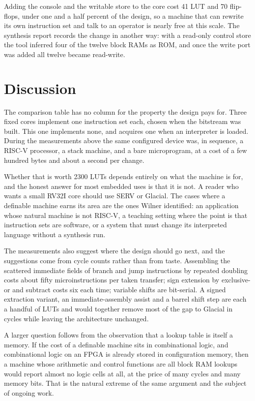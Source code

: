 \documentclass[11pt,a4paper]{article}
\begin{document}
Adding the console and the writable store to the core cost 41 LUT and
70 flip-flops, under one and a half percent of the design, so a machine
that can rewrite its own instruction set and talk to an operator is
nearly free at this scale. The synthesis report records the change in
another way: with a read-only control store the tool inferred four of
the twelve block RAMs as ROM, and once the write port was added all
twelve became read-write.

\section{Discussion}

The comparison table has no column for the property the design pays
for. Three fixed cores implement one instruction set each, chosen when
the bitstream was built. This one implements none, and acquires one
when an interpreter is loaded. During the measurements above the same
configured device was, in sequence, a RISC-V processor, a stack
machine, and a bare microprogram, at a cost of a few hundred bytes and
about a second per change.

Whether that is worth 2300 LUTs depends entirely on what the machine is
for, and the honest answer for most embedded uses is that it is not. A
reader who wants a small RV32I core should use SERV or Glacial. The
cases where a definable machine earns its area are the ones Wilner
identified: an application whose natural machine is not RISC-V, a
teaching setting where the point is that instruction sets are software,
or a system that must change its interpreted language without a
synthesis run.

The measurements also suggest where the design should go next, and the
suggestions come from cycle counts rather than from taste. Assembling
the scattered immediate fields of branch and jump instructions by
repeated doubling costs about fifty microinstructions per taken
transfer; sign extension by exclusive-or and subtract costs six each
time; variable shifts are bit-serial. A signed extraction variant, an
immediate-assembly assist and a barrel shift step are each a handful of
LUTs and would together remove most of the gap to Glacial in cycles
while leaving the architecture unchanged.

A larger question follows from the observation that a lookup table is
itself a memory. If the cost of a definable machine sits in
combinational logic, and combinational logic on an FPGA is already
stored in configuration memory, then a machine whose arithmetic and
control functions are all block RAM lookups would report almost no
logic cells at all, at the price of many cycles and many memory bits.
That is the natural extreme of the same argument and the subject of
ongoing work.
\end{document}
